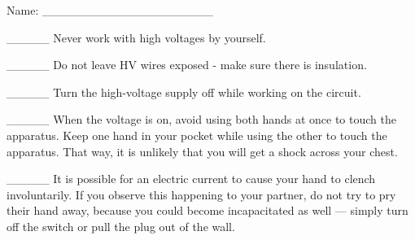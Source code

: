 
Name: \_\_\_\_\_\_\_\_\_\_\_\_\_\_\_\_\_\_\_\_

\_\_\_\_\_ Never work with high voltages by yourself.

\_\_\_\_\_ Do not leave HV wires exposed - make sure
there is insulation.

\_\_\_\_\_ Turn the high-voltage supply off while working on the circuit.

\_\_\_\_\_ When the voltage is on, avoid using both hands at
once to touch the apparatus. Keep one hand in your pocket
while using the other to touch the apparatus. That way, it
is unlikely that you will get a shock across your chest. 

\_\_\_\_\_ It is possible for an electric current to cause
your hand to clench involuntarily. If you observe this
happening to your partner, do not try to pry their hand
away, because you could become incapacitated as well ---
simply turn off the switch or pull the plug out of the wall.
